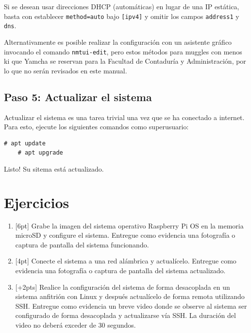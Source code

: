 \documentclass[letterpaper,10.5pt]{article}
\begin{document}
Si se desean usar direcciones DHCP (automáticas) en lugar de una IP estática, basta con establecer \texttt{method=auto} bajo \texttt{[ipv4]} y omitir los campos \texttt{address1} y \texttt{dns}.

Alternativamente es posible realizar la configuración con un asistente gráfico invocando el comando \texttt{nmtui-edit}, pero estos métodos para muggles con menos ki que Yamcha se reservan para la Facultad de Contaduría y Administración, por lo que no serán revisados en este manual.

%
%
\subsection{Paso 5: Actualizar el sistema}%
\label{sec:system-update}
Actualizar el sistema es una tarea trivial una vez que se ha conectado a internet.
Para esto, ejecute los siguientes comandos como superusuario:

\begin{Verbatim}[gobble=1]
	# apt update
	# apt upgrade
\end{Verbatim}

\medskip{}
\noindent Listo! Su sitema está actualizado.
\cleardoublepage{}

%
%
\section{Ejercicios}%
\label{sec:excercises}

\begin{enumerate}
	\item{} [6pt] Grabe la imagen del sistema operativo Raspberry Pi OS en la memoria microSD y configure el sistema.
	Entregue como evidencia una fotografía o captura de pantalla del sistema funcionando.

	\item{} [4pt] Conecte el sistema a una red alámbrica y actualícelo.
	Entregue como evidencia una fotografía o captura de pantalla del sistema actualizado.

	\item{} [+2pts] Realice la configuración del sistema de forma desacoplada en un sistema anfitrión con Linux y después actualícelo de forma remota utilizando SSH. %
	Entregue como evidencia un breve video donde se observe al sistema ser configurado de forma desacoplada y actualizarse vía SSH. %
	La duración del video no deberá exceder de 30 segundos.
\end{enumerate}
\end{document}
